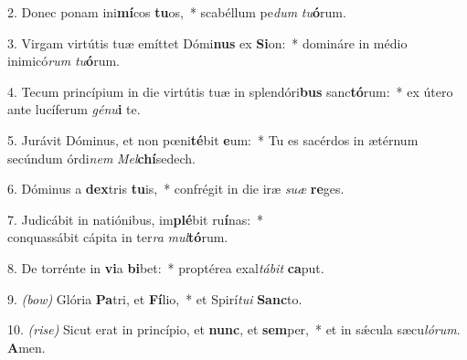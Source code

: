 2. Donec ponam ini\textbf{mí}cos \textbf{tu}os,~*
	scabéllum pe\textit{dum} \textit{tu}\textbf{ó}rum.

3. Virgam virtútis tuæ emíttet Dómi\textbf{nus} ex \textbf{Si}on:~*
	domináre in médio inimicó\textit{rum} \textit{tu}\textbf{ó}rum.

4. Tecum princípium in die virtútis tuæ in splendóri\textbf{bus} sanc\textbf{tó}rum:~*
	ex útero ante lucíferum \textit{gé}\textit{nu}\textbf{i} te.

5. Jurávit Dóminus, et non p{\oe}ni\textbf{té}\-bit \textbf{e}um:~*
	Tu es sacérdos in ætérnum secúndum órdi\textit{nem} \textit{Mel}\textbf{chí}se\-dech.

6. Dóminus a \textbf{dex}tris \textbf{tu}is,~*
	confrégit in die iræ \textit{su}\textit{æ} \textbf{re}ges.

7. Judicábit in natiónibus, im\textbf{plé}bit ru\textbf{í}nas:~*\\
	conquassábit cápita in ter\textit{ra} \textit{mul}\textbf{tó}rum.

8. De torrénte in \textbf{vi}a \textbf{bi}bet:~*
	proptérea exal\textit{tá}\textit{bit} \textbf{ca}put.

9. {\color{red}\textit{(bow)}} Glória \textbf{Pa}tri, et \textbf{Fí}lio,~*
	et Spirí\textit{tu}\textit{i} \textbf{Sanc}to.

10. {\color{red}\textit{(rise)}} Sicut erat in princípio, et \textbf{nunc}, et \textbf{sem}per,~*
	et in s\'{\ae}cula sæcu\textit{ló}\textit{rum}. \textbf{A}men.
